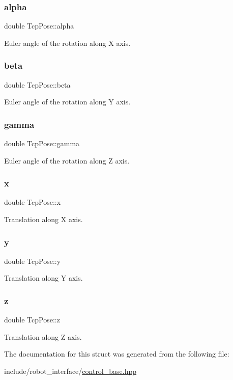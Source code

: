 \subsubsection{\texorpdfstring{alpha}{alpha}}
{\footnotesize\ttfamily double Tcp\+Pose\+::alpha}

Euler angle of the rotation along X axis. \mbox{\label{structTcpPose_af07e5cf32da9710974e8b1eb3a654928}} 
\subsubsection{\texorpdfstring{beta}{beta}}
{\footnotesize\ttfamily double Tcp\+Pose\+::beta}

Euler angle of the rotation along Y axis. \mbox{\label{structTcpPose_ae8efa3b9d6a4dfd78db315ffa28a23cc}} 
\subsubsection{\texorpdfstring{gamma}{gamma}}
{\footnotesize\ttfamily double Tcp\+Pose\+::gamma}

Euler angle of the rotation along Z axis. \mbox{\label{structTcpPose_ae394f2f7f9f51d60e868075712f87244}} 
\subsubsection{\texorpdfstring{x}{x}}
{\footnotesize\ttfamily double Tcp\+Pose\+::x}

Translation along X axis. \mbox{\label{structTcpPose_a1050d339d788176b4323367a0150ad71}} 
\subsubsection{\texorpdfstring{y}{y}}
{\footnotesize\ttfamily double Tcp\+Pose\+::y}

Translation along Y axis. \mbox{\label{structTcpPose_a2c538c7a01a6950bcd9d6c2377f85ade}} 
\subsubsection{\texorpdfstring{z}{z}}
{\footnotesize\ttfamily double Tcp\+Pose\+::z}

Translation along Z axis. 

The documentation for this struct was generated from the following file\+:\begin{DoxyCompactItemize}
\item 
include/robot\+\_\+interface/\hyperlink{control__base_8hpp}{control\+\_\+base.\+hpp}\end{DoxyCompactItemize}

